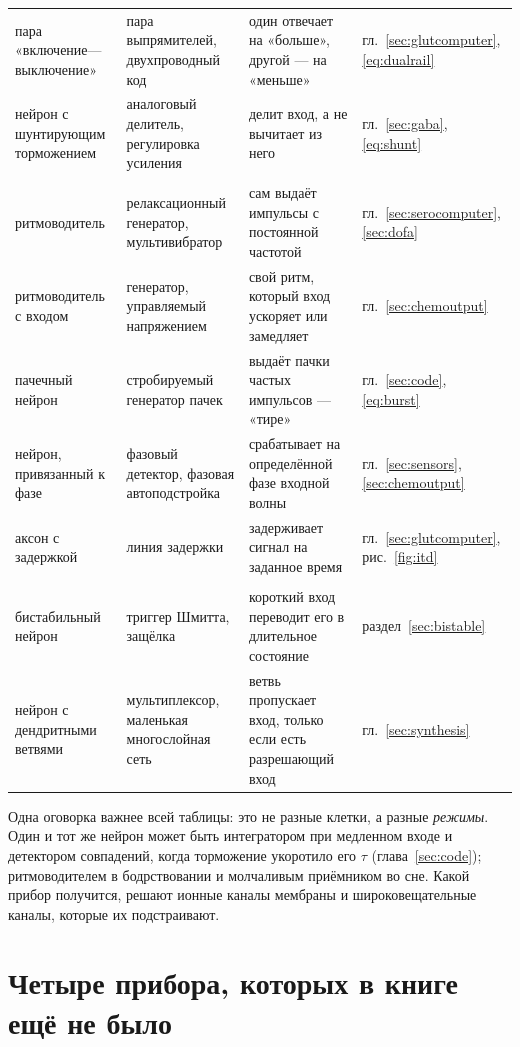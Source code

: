 \begin{center}
\begin{longtable}{>{\raggedright}p{3.1cm}>{\raggedright}p{3.3cm}>{\raggedright}p{4.7cm}>{\raggedright\arraybackslash}p{2.4cm}}
пара «включение---выключение» & пара выпрямителей, двухпроводный код & один отвечает на «больше», другой --- на «меньше» & гл.~\ref{sec:glutcomputer}, \eqref{eq:dualrail} \\
нейрон с шунтирующим торможением & аналоговый делитель, регулировка усиления & делит вход, а не вычитает из него & гл.~\ref{sec:gaba}, \eqref{eq:shunt} \\
\midrule
\multicolumn{4}{l}{\emph{Генераторы и время}} \\
ритмоводитель & релаксационный генератор, мультивибратор & сам выдаёт импульсы с постоянной частотой & гл.~\ref{sec:serocomputer}, \ref{sec:dofa} \\
ритмоводитель с входом & генератор, управляемый напряжением & свой ритм, который вход ускоряет или замедляет & гл.~\ref{sec:chemoutput} \\
пачечный нейрон & стробируемый генератор пачек & выдаёт пачки частых импульсов --- «тире» & гл.~\ref{sec:code}, \eqref{eq:burst} \\
нейрон, привязанный к фазе & фазовый детектор, фазовая автоподстройка & срабатывает на определённой фазе входной волны & гл.~\ref{sec:sensors}, \ref{sec:chemoutput} \\
аксон с задержкой & линия задержки & задерживает сигнал на заданное время & гл.~\ref{sec:glutcomputer}, рис.~\ref{fig:itd} \\
\midrule
\multicolumn{4}{l}{\emph{Память и переключение}} \\
бистабильный нейрон & триггер Шмитта, защёлка & короткий вход переводит его в длительное состояние & раздел~\ref{sec:bistable} \\
нейрон с дендритными ветвями & мультиплексор, маленькая многослойная сеть & ветвь пропускает вход, только если есть разрешающий вход & гл.~\ref{sec:synthesis} \\
\end{longtable}
\end{center}

Одна оговорка важнее всей таблицы: это не разные клетки, а разные \emph{режимы}. Один и тот же нейрон может быть интегратором при медленном входе и детектором совпадений, когда торможение укоротило его $\tau$ (глава~\ref{sec:code}); ритмоводителем в бодрствовании и молчаливым приёмником во сне. Какой прибор получится, решают ионные каналы мембраны и широковещательные каналы, которые их подстраивают.

\section{Четыре прибора, которых в книге ещё не было}

